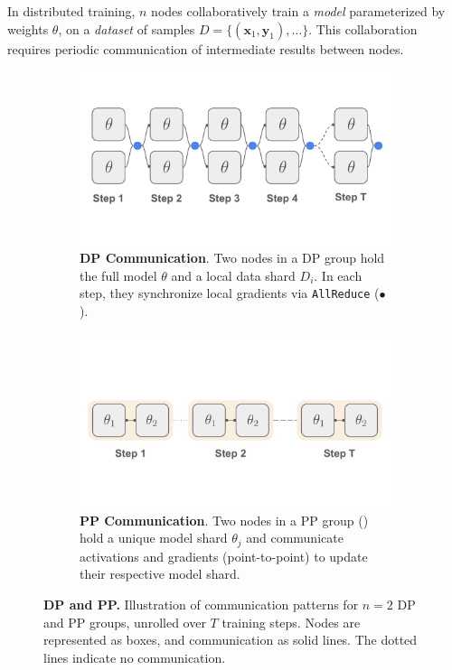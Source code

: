 \documentclass{article}
\newcommand{\orangebox}{\colorbox{oorange!50}{\hspace{0.3em}}}
\newcommand{\bluecircle}{\textcolor{bblue}{\LARGE$\bullet$}}
\begin{document}
In distributed training, $n$ nodes collaboratively train a \textit{model} parameterized by weights $\theta$, on a \textit{dataset} of samples $D = \{(\mathbf{x}_1, \mathbf{y}_1),\dots\}$. This collaboration requires periodic communication of intermediate results between nodes.

\begin{figure}[ht]
    \centering
    \begin{subfigure}[b]{0.48\textwidth}
        \centering
        \vspace{0.5cm}
        \includegraphics[width=\textwidth]{figures/dp.pdf}
        \caption{\textbf{DP Communication}. Two nodes in a DP group hold the full model $\theta$ and a local data shard $D_i$. In each step, they synchronize local gradients via \texttt{AllReduce} (\bluecircle).}
        \label{fig:dp}
    \end{subfigure}
    \hfill
    \begin{subfigure}[b]{0.45\textwidth}
        \centering
        \vspace{0.5cm}
        \includegraphics[width=\textwidth]{figures/pp.pdf}
        \caption{\textbf{PP Communication}. Two nodes in a PP group (\orangebox) hold a unique model shard $\theta_j$ and communicate activations and gradients (point-to-point) to update their respective model shard.}
        \label{fig:pp}
    \end{subfigure}
    \caption{\textbf{DP and PP.} Illustration of communication patterns for $n=2$ DP and PP groups, unrolled over $T$ training steps. Nodes are represented as boxes, and communication as solid lines. The dotted lines indicate no communication.}
\end{figure}
\end{document}
